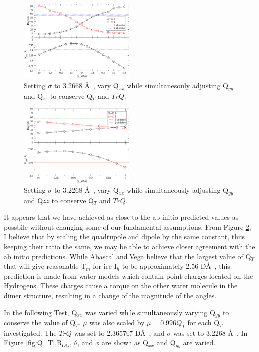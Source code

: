 \documentclass[aps, jcp, prl, reprint, groupedaddress, superscriptaddress, twocolumn]{revtex4-1}
\begin{document}
\begin{figure}[h!]
\includegraphics[width = 0.5\textwidth]{Test6_plot.pdf}
\caption{\label{fig:Qxx4} Setting $\sigma$ to 3.2668 \AA~, vary Q$_{xx}$ while simultanesouly adjusting Q$_{yy}$ and Q$_{zz}$ to conserve Q$_T$ and $TrQ$.}
\end{figure}

\begin{figure}[h!]
\includegraphics[width = 0.5\textwidth]{Test7_plot.pdf}
\caption{\label{fig:Qxx5} Setting $\sigma$ to 3.2268 \AA~, vary Q$_{xx}$ while simultaneously adjusting Q$_{yy}$ and Q${zz}$ to conserve Q$_T$ and $TrQ$.}
\end{figure}

It appears that we have achieved as close to the ab initio predicted values
as possbile without changing some of our fundamental assumptions. From Figure
\ref{fig:Qxx5}, I believe that by scaling the quadrupole and dipole by 
the same constant, thus keeping their ratio the same, we may be able to achieve
closer agreement with the ab initio predictions. While Abascal and Vega believe
that the largest value of Q$_T$ that will give reasonable T$_m$ for ice I$_h$
to be approximately 2.56 D\AA~, this prediction is made from water models which
contain point charges located on the Hydrogens. These charges cause a torque
on the other water molecule in the dimer structure, resulting in a change of
the magnitude of the angles.

In the following Test, Q$_{xx}$ was varied while simultaneously varying
Q$_{yy}$ to conserve the value of Q$_T$. 
$\mu$ was also scaled by $\mu = 0.996 Q_T$ for each Q$_T$ investigated. 
The $TrQ$ was set to 2.365707 D\AA~, and $\sigma$
was set to 3.2268 \AA~. In Figure \ref{fig:Q_T},R$_{OO}$, $\theta$, and 
$\phi$ are shown as Q$_{xx}$ and Q$_{yy}$ are varied.
\end{document}
